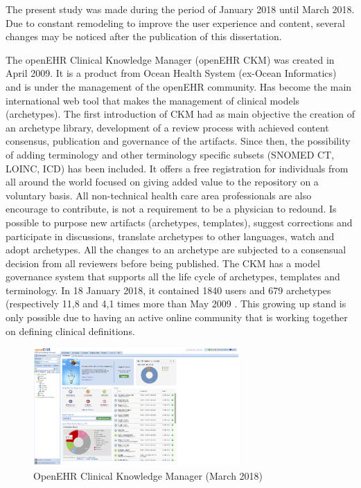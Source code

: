 \documentclass[mim_thesis.tex]{subfiles}
\begin{document}
The present study was made during the period of January 2018 until March 2018. Due to constant remodeling to improve the user experience and content, several changes may be noticed after the publication of this dissertation.

The openEHR Clinical Knowledge Manager (openEHR CKM) was created in April 2009. It is a product from Ocean Health System (ex-Ocean Informatics) and is under the management of the openEHR community. Has become the main international web tool that makes the management of clinical models (archetypes). The first introduction of CKM had as main objective the creation of an archetype library, development of a review process with achieved content consensus, publication and governance of the artifacts. Since then, the possibility of adding terminology and other terminology specific subsets (SNOMED CT,  LOINC, ICD) has been included. It offers a free registration for individuals from all around the world focused on giving added value to the repository on a voluntary basis. All non-technical health care area professionals are also encourage to contribute, is not a requirement to be a physician to redound. Is possible to purpose new artifacts (archetypes, templates), suggest corrections and participate in discussions, translate archetypes to other languages, watch and adopt archetypes. All the changes to an archetype are subjected to a consensual decision from all reviewers before being published. The CKM has a model governance system that supports all the life cycle of archetypes, templates and terminology. In 18 January 2018, it contained 1840 users and 679 archetypes (respectively 11,8 and 4,1 times more than May 2009 \citep{conde2010towards}. This growing up stand is only possible due to having an active online community that is working together on defining clinical definitions. 

\begin{figure}[H]
	\centering
    \includegraphics[width=0.7\textwidth]{img/openehr_ckm.PNG}
	\caption{OpenEHR Clinical Knowledge Manager (March 2018)}
	\label{fig:openehr_ckm}
\end{figure}
\end{document}
